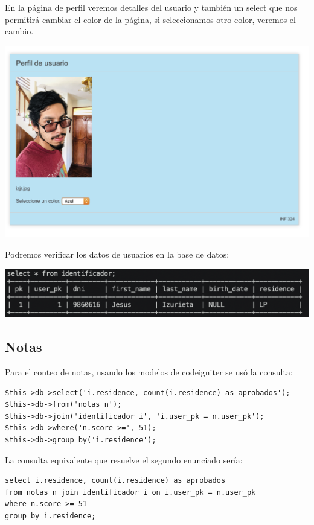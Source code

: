\documentclass[letter]{article}
\begin{document}
En la página de perfil veremos detalles del usuario y también un select que nos
permitirá cambiar el color de la página, si seleccionamos otro color, veremos el
cambio.

\begin{center}
\includegraphics[width=.9\linewidth]{./img/azul.png}
\end{center}

Podremos verificar los datos de usuarios en la base de datos:

\begin{center}
\includegraphics[width=.9\linewidth]{./img/iden.png}
\end{center}

\subsection{Notas}
\label{sec:org2e98944}
Para el conteo de notas, usando los modelos de codeigniter se usó la consulta:

\begin{verbatim}
$this->db->select('i.residence, count(i.residence) as aprobados');
$this->db->from('notas n');
$this->db->join('identificador i', 'i.user_pk = n.user_pk');
$this->db->where('n.score >=', 51);
$this->db->group_by('i.residence');
\end{verbatim}

La consulta equivalente que resuelve el segundo enunciado sería:

\begin{verbatim}
select i.residence, count(i.residence) as aprobados
from notas n join identificador i on i.user_pk = n.user_pk
where n.score >= 51
group by i.residence;
\end{verbatim}
\end{document}
